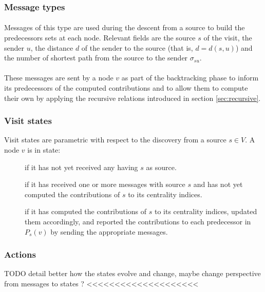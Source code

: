 \subsubsection{Message types}

\paragraph{} Messages of this type are used during the descent from a source to build the predecessors sets at each node. Relevant fields are the source $s$ of the visit, the sender $u$, the distance $d$ of the sender to the source (that is, $d = d(s,u)$) and the number of shortest path from the source to the sender $\sigma_{su}$.

\paragraph{} These messages are sent by a node $v$ as part of the backtracking phase to inform its predecessors of the computed contributions and to allow them to compute their own by applying the recursive relations introduced in section \ref{sec:recursive}.

\subsubsection{Visit states}

Visit states are parametric with respect to the discovery from a source $s \in V$. A node $v$ is in state:
\begin{description}
\item[] if it has not yet received any \mdisc{} having $s$ as source.
\item[] if it has received one or more \mdisc{} messages with source $s$ and has not yet computed the contributions of $s$ to its centrality indices.
\item[] if it has computed the contributions of $s$ to its centrality indices, updated them accordingly, and reported the contributions to each predecessor in $P_s(v)$ by sending the appropriate \mrep{} messages.
\end{description}

\subsubsection{Actions}
TODO detail better how the states evolve and change, maybe change perspective from messages to states ? <<<<<<<<<<<<<<<<<<<<

